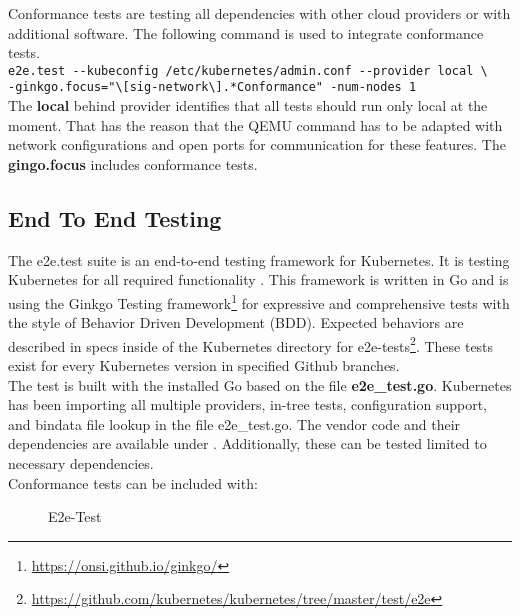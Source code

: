 Conformance tests are testing all dependencies with other cloud providers or with additional software. The following command is used to integrate conformance tests. \\
\verb+e2e.test --kubeconfig /etc/kubernetes/admin.conf --provider local \+ \\
\verb+-ginkgo.focus="\[sig-network\].*Conformance" -num-nodes 1+  \\
The \textbf{local} behind provider identifies that all tests should run only local at the moment. That has the reason that the \gls{QEMU} command has to be adapted with network configurations and open ports for communication for these features.
The \textbf{gingo.focus} includes conformance tests.


\subsection{End To End Testing}
The e2e.test suite is an end-to-end testing framework for Kubernetes. It is testing Kubernetes for all required functionality \cite{Ohly2019}. This framework is written in Go and is using the Ginkgo Testing framework\footnote{\url{https://onsi.github.io/ginkgo/}} for expressive and comprehensive tests with the style of Behavior Driven Development (BDD).
Expected behaviors are described in specs inside of the Kubernetes directory for e2e-tests\footnote{\url{https://github.com/kubernetes/kubernetes/tree/master/test/e2e}}. These tests exist for every Kubernetes version in specified Github branches. \\
The test is built with the installed Go based on the file \textbf{e2e\_test.go}. Kubernetes has been importing all multiple providers, in-tree tests, configuration support, and bindata file lookup in the file e2e\_test.go.
The vendor code and their dependencies are available under . Additionally, these can be tested limited to necessary dependencies. \\
Conformance tests can be included with: \\
\begin{figure}[H]
\centering
{}
 \caption{E2e-Test}
    \label{e2e-test}
\end{figure}

